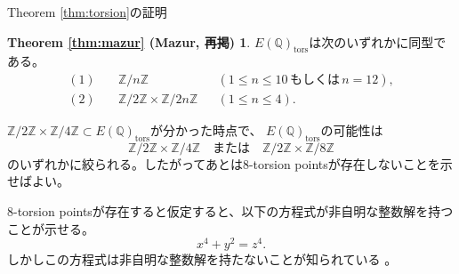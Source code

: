 \documentclass{classes/mybeamer}
\begin{document}
\begin{frame}{Theorem \ref{thm:torsion}の証明}
    \theoremstyle{definition}
    \newtheorem*{MazurTheorem}{Theorem \ref{thm:mazur} (Mazur, 再掲)}
    \begin{MazurTheorem}
        $E(\mathbb{Q})_{\text{tors}}$は次のいずれかに同型である。
        \begin{equation}
            \begin{aligned}
                (1)\quad & \mathbb{Z}/n\mathbb{Z}                                &  & (1 \leq n \leq 10\,\mbox{もしくは}\,n=12), \\
                (2)\quad & \mathbb{Z}/2\mathbb{Z} \times \mathbb{Z}/2n\mathbb{Z} &  & (1 \leq n \leq 4).
            \end{aligned}
        \end{equation}
    \end{MazurTheorem}
    $\mathbb{Z}/2\mathbb{Z}\times\mathbb{Z}/4\mathbb{Z} \subset E(\mathbb{Q})_\mathrm{tors}$が分かった時点で、
    $E(\mathbb{Q})_\mathrm{tors}$の可能性は
    \begin{equation}
        \mathbb{Z}/2\mathbb{Z} \times \mathbb{Z}/4\mathbb{Z} \quad\text{または}\quad \mathbb{Z}/2\mathbb{Z} \times \mathbb{Z}/8\mathbb{Z}
    \end{equation}
    のいずれかに絞られる。したがってあとは8-torsion pointsが存在しないことを示せばよい。

    \begin{alertblock}{}
        8-torsion pointsが存在すると仮定すると、以下の方程式が非自明な整数解を持つことが示せる。
        \begin{equation}
            x^4 + y^2 = z^4.
        \end{equation}
        しかしこの方程式は非自明な整数解を持たないことが知られている \cite{ref:aec}。
    \end{alertblock}
\end{frame}
\end{document}

